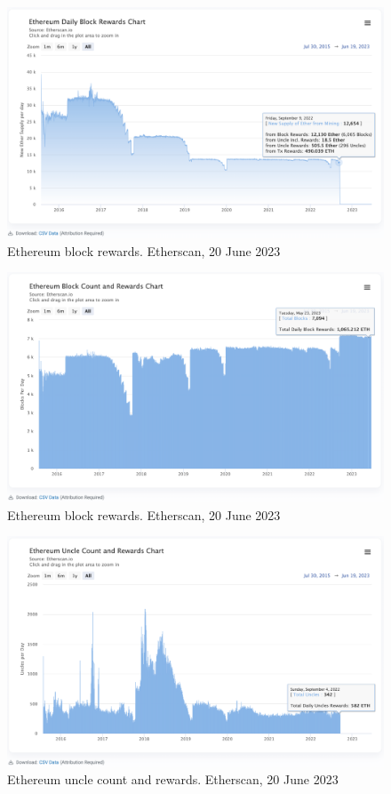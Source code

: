 \documentclass[UTF8]{article}
\begin{document}
\begin{figure}[htbp]
\begin{center}
\includegraphics[width=0.9\linewidth]{images/ethblkreward}
\caption{Ethereum block rewards. Etherscan, 20 June 2023}
\label{fig:ethblkreward}
\end{center}
\end{figure}

\begin{figure}[htbp]
\begin{center}
\includegraphics[width=0.9\linewidth]{images/ethblkcnt}
\caption{Ethereum block rewards. Etherscan, 20 June 2023}
\label{fig:ethblkcnt}
\end{center}
\end{figure}

\begin{figure}[htbp]
\begin{center}
\includegraphics[width=0.9\linewidth]{images/ethuncle}
\caption{Ethereum uncle count and rewards. Etherscan, 20 June 2023}
\label{fig:ethuncle}
\end{center}
\end{figure}
\end{document}
